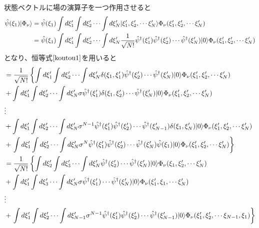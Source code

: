 \documentclass[dvipdfmx, 11pt, a4paper]{jsarticle}
\numberwithin{equation}{section}
\theoremstyle{definition}
\begin{document}
    \begin{derivationBox}
        状態ベクトルに場の演算子を一つ作用させると
        \begin{align}
            \hat{\psi}(\xi_1) | \Phi_\nu \rangle &= \hat{\psi}(\xi_1) \int d\xi_1' \int d\xi_2' \cdots \int d\xi_N' |\xi_1',\xi_2',\cdots\xi_N' \rangle \Phi_\nu  (\xi_1',\xi_2',\cdots \xi_N') \notag \\
            &= \hat{\psi}(\xi_1) \int d\xi_1' \int d\xi_2' \cdots \int d\xi_N' \frac{1}{\sqrt{N!}} \hat{\psi}^\dagger (\xi_1') \hat{\psi}^\dagger (\xi_2')\cdots \hat{\psi}^\dagger (\xi_N') |0\rangle  \Phi_\nu  (\xi_1',\xi_2',\cdots \xi_N') \notag 
        \end{align}
        となり、恒等式$\eqref{koutou1}$を用いると
        \begin{align}
            &= \frac{1}{\sqrt{N!}}\left\{ \int d\xi_1' \int d\xi_2' \cdots \int d\xi_N' \delta(\xi_1, \xi_1') \hat{\psi}^\dagger (\xi_2')\cdots \hat{\psi}^\dagger (\xi_N') |0\rangle  \Phi_\nu  (\xi_1',\xi_2',\cdots \xi_N') \right. \notag \\
            &+ \int d\xi_1' \int d\xi_2' \cdots \int d\xi_N' \sigma \hat{\psi}^\dagger (\xi_1') \delta(\xi_1, \xi_2') \cdots \hat{\psi}^\dagger (\xi_N') |0\rangle  \Phi_\nu  (\xi_1',\xi_2',\cdots \xi_N')  \notag \\
            &\vdots \notag \\
            &+ \int d\xi_1' \int d\xi_2' \cdots \int d\xi_N' \sigma^{N-1} \hat{\psi}^\dagger (\xi_1') \hat{\psi}^\dagger (\xi_2')\cdots \hat{\psi}^\dagger (\xi_{N-1}') \delta(\xi_1,\xi_N') |0\rangle  \Phi_\nu  (\xi_1',\xi_2',\cdots \xi_N')  \notag \\
            &+ \left. \int d\xi_1' \int d\xi_2' \cdots \int d\xi_N' \sigma^N \hat{\psi}^\dagger (\xi_1') \hat{\psi}^\dagger (\xi_2')\cdots \hat{\psi}^\dagger (\xi_N') \hat{\psi}(\xi_1) |0\rangle  \Phi_\nu  (\xi_1',\xi_2',\cdots \xi_N') \right\} \notag \\
            &= \frac{1}{\sqrt{N!}}\left\{ \int d\xi_2' \int d\xi_3' \cdots \int d\xi_N'  \hat{\psi}^\dagger (\xi_2')\cdots \hat{\psi}^\dagger (\xi_N') |0\rangle  \Phi_\nu  (\xi_1,\xi_2',\cdots \xi_N') \right. \notag \\
            &+ \int d\xi_1' \int d\xi_3' \cdots \int d\xi_N' \sigma \hat{\psi}^\dagger (\xi_1') \cdots \hat{\psi}^\dagger (\xi_N') |0\rangle  \Phi_\nu  (\xi_1',\xi_1,\cdots \xi_N')  \notag \\
            &\vdots \notag \\
            &+ \left. \int d\xi_1' \int d\xi_2' \cdots \int d\xi_{N-1}' \sigma^{N-1} \hat{\psi}^\dagger (\xi_1') \hat{\psi}^\dagger (\xi_2')\cdots \hat{\psi}^\dagger (\xi_{N-1}') |0\rangle  \Phi_\nu  (\xi_1',\xi_2',\cdots \xi_{N-1}, \xi_1) \right\} \notag

\end{align}
\end{derivationBox}
\end{document}
